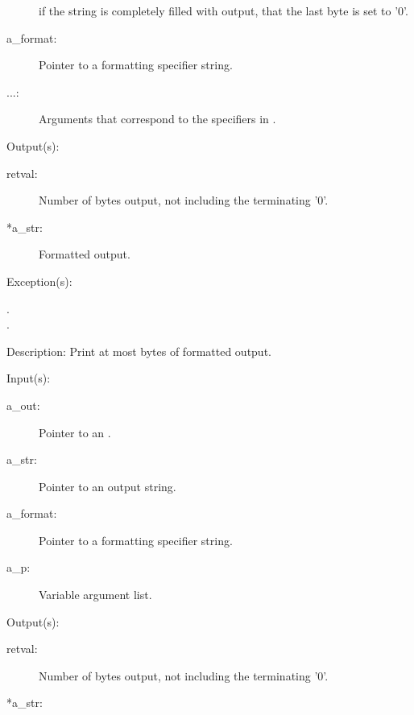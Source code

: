 \begin{capi}
\begin{capilist}
\begin{description}
			if the string is completely filled with output, that the
			last byte is set to '{\bs}0'.
		\item[a\_format: ]
			Pointer to a formatting specifier string.
		\item[...: ]
			Arguments that correspond to the specifiers in
			.
		\end{description}
	\item[Output(s): ]
		\begin{description}\item[]
		\item[retval: ]
			Number of bytes output, not including the terminating
			'{\bs}0'.
		\item[*a\_str: ]
			Formatted output.
		\end{description}
	\item[Exception(s): ]
		\begin{description}\item[]
		\item[.]
		\item[.]
		\end{description}
	\item[Description: ]
		Print at most  bytes of formatted output.
	\end{capilist}
\label{out_put_sv}
	\begin{capilist}
	\item[Input(s): ]
		\begin{description}\item[]
		\item[a\_out: ]
			Pointer to an .
		\item[a\_str: ]
			Pointer to an output string.
		\item[a\_format: ]
			Pointer to a formatting specifier string.
		\item[a\_p: ]
			Variable argument list.
		\end{description}
	\item[Output(s): ]
		\begin{description}\item[]
		\item[retval: ]
			Number of bytes output, not including the terminating
			'{\bs}0'.
		\item[*a\_str: ]

\end{description}
\end{capilist}
\end{capi}
